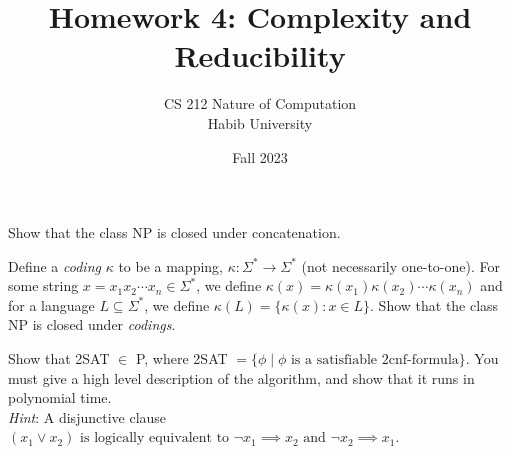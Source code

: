 \documentclass[addpoints,a4paper]{exam}
\title{Homework 4: Complexity and Reducibility}
\author{CS 212 Nature of Computation\\Habib University}
\date{Fall 2023}
\begin{document}
\maketitle

\begin{questions}
  

\question


\question Show that the class NP is closed under concatenation.

        \question Define a \textit{coding} $\kappa$ to be a mapping,  $\kappa:\Sigma^*\rightarrow \Sigma^*$ (not necessarily one-to-one). For some string $x = x_1x_2\cdots x_n\in\Sigma^*$, we define $\kappa(x) = \kappa(x_1)\kappa(x_2)\cdots\kappa(x_n)$ and for a language $L\subseteq \Sigma^*$, we define $\kappa(L) = \{\kappa(x): x\in L \}$. Show that the class NP is closed under \textit{codings}. 


\question Show that 2SAT $\in$  P, where 2SAT $ = \{ \phi \mid \phi \text{ is a satisfiable 2cnf-formula}\}$. You must give a high level description of the algorithm, and show that it runs in polynomial time. \\ \textit{Hint}: A disjunctive clause $(x_1 \vee x_2) \text{ is logically equivalent to } \neg x_1 \implies x_2 \text{ and } \neg x_2 \implies x_1$.

\end{questions}
\end{document}
